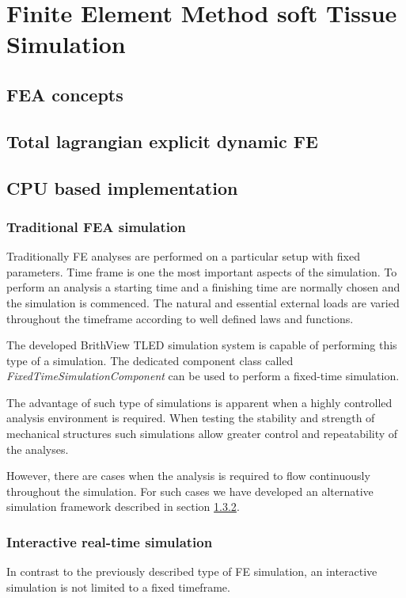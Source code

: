 \section{Finite Element Method soft Tissue Simulation}\label{methodology-fea}

\subsection{FEA concepts}

\subsection{Total lagrangian explicit dynamic FE}

\subsection{CPU based implementation}

  \subsubsection{Traditional FEA simulation}

  Traditionally FE analyses are performed on a particular setup with fixed parameters. Time frame is one the most important aspects of the simulation. To perform an analysis a starting time and a finishing time are normally chosen and the simulation is commenced. The natural and essential external loads are varied throughout the timeframe according to well defined laws and functions.

  The developed BrithView TLED simulation system is capable of performing this type of a simulation. The dedicated component class called \textit{FixedTimeSimulationComponent} can be used to perform a fixed-time simulation.

  The advantage of such type of simulations is apparent when a highly controlled analysis environment is required. When testing the stability and strength of mechanical structures such simulations allow greater control and repeatability of the analyses.

  However, there are cases when the analysis is required to flow continuously throughout the simulation. For such cases we have developed an alternative simulation framework described in section \ref{methodology-fea-interactive}.

  \subsubsection{Interactive real-time simulation}\label{methodology-fea-interactive}

  In contrast to the previously described type of FE simulation, an interactive simulation is not limited to a fixed timeframe.
